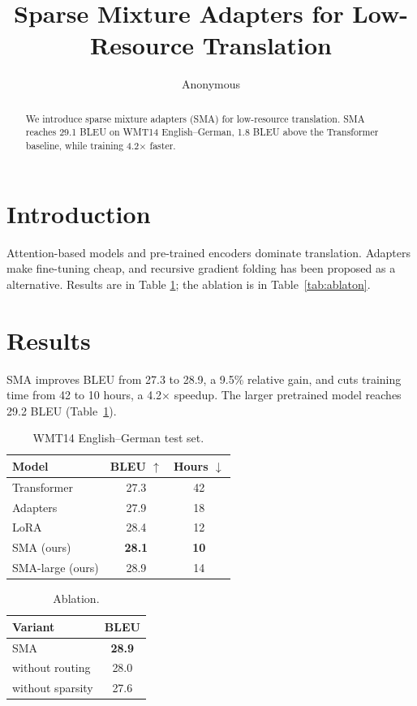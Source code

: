 \documentclass{article}
\title{Sparse Mixture Adapters for Low-Resource Translation}
\author{Anonymous}
\begin{document}
\maketitle


\begin{abstract}
We introduce sparse mixture adapters (SMA) for low-resource translation.
SMA reaches 29.1 BLEU on WMT14 English--German, 1.8 BLEU above the Transformer baseline,
while training 4.2$\times$ faster.
\end{abstract}

\section{Introduction}
Attention-based models \citep{vaswani2017attention} and pre-trained encoders \citep{devlin2019bert}
dominate translation. Adapters \citep{houlsby2019parameter} make fine-tuning cheap, and recursive
gradient folding \citep{li2023recursive} has been proposed as a alternative.
Results are in Table \ref{tab:main}; the ablation is in Table~\ref{tab:ablaton}.

\section{Results}
SMA improves BLEU from 27.3 to 28.9, a 9.5\% relative gain, and cuts training time from 42 to 10 hours,
a 4.2$\times$ speedup.
The larger pretrained model reaches 29.2 BLEU (Table~\ref{tab:main}).

\begin{table}[t]
\centering
\caption{WMT14 English--German test set.}
\label{tab:main}
\begin{tabular}{lcc}
\toprule
Model & BLEU $\uparrow$ & Hours $\downarrow$ \\
\midrule
Transformer \citep{vaswani2017attention} & 27.3 & 42 \\
Adapters \citep{houlsby2019parameter} & 27.9 & 18 \\
LoRA & 28.4 & 12 \\
SMA (ours) & \textbf{28.1} & \textbf{10} \\
SMA-large (ours) & 28.9 & 14 \\
\bottomrule
\end{tabular}
\end{table}

\begin{table}[t]
\centering
\caption{Ablation.}
\label{tab:ablation}
\begin{tabular}{lc}
\toprule
Variant & BLEU \\
\midrule
SMA & \textbf{28.9} \\
without routing & 28.0 \\
without sparsity & 27.6 \\
\bottomrule
\end{tabular}
\end{table}



\end{document}
